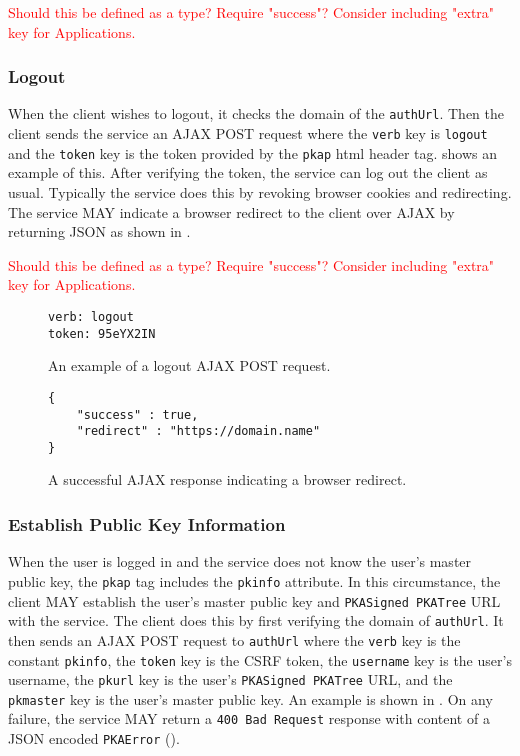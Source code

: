 \documentclass{article}
\newcommand{\todo}[1]{\textcolor{red}{#1}}
\begin{document}
\todo{Should this be defined as a type? Require "success"? Consider including "extra" key for Applications.}

\subsubsection{Logout}

When the client wishes to logout, it checks the domain of the \texttt{authUrl}. 
Then the client sends the service an AJAX POST request where the \texttt{verb} key is \texttt{logout} and the \texttt{token} key is the token provided by the \texttt{pkap} html header tag. 
 shows an example of this. 
After verifying the token, the service can log out the client as usual. 
Typically the service does this by revoking browser cookies and redirecting. 
The service MAY indicate a browser redirect to the client over AJAX by returning JSON as shown in . 

\todo{Should this be defined as a type? Require "success"? Consider including "extra" key for Applications.}

\begin{figure}
\begin{lstlisting}
verb: logout
token: 95eYX2IN
\end{lstlisting}
\caption{An example of a logout AJAX POST request.}
\label{fig:logout_req}
\end{figure}

\begin{figure}
\begin{lstlisting}
{
    "success" : true,
    "redirect" : "https://domain.name"
}
\end{lstlisting}
\caption{A successful AJAX response indicating a browser redirect.}
\label{fig:logout_redirect}
\end{figure}


\subsubsection{Establish Public Key Information}

When the user is logged in and the service does not know the user's master public key, the \texttt{pkap} tag includes the \texttt{pkinfo} attribute. 
In this circumstance, the client MAY establish the user's master public key and \texttt{PKASigned PKATree} URL with the service. 
The client does this by first verifying the domain of \texttt{authUrl}.
It then sends an AJAX POST request to \texttt{authUrl} where the \texttt{verb} key is the constant \texttt{pkinfo}, the \texttt{token} key is the CSRF token, the \texttt{username} key is the user's username, the \texttt{pkurl} key is the user's \texttt{PKASigned PKATree} URL, and the \texttt{pkmaster} key is the user's master public key. 
An example is shown in . 
On any failure, the service MAY return a \texttt{400 Bad Request} response with content of a JSON encoded \texttt{PKAError} (). 
\end{document}
